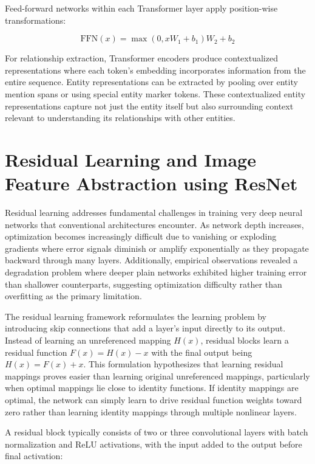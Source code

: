 \documentclass[12pt,a4paper]{report}
\begin{document}
Feed-forward networks within each Transformer layer apply position-wise transformations:

\begin{equation}
\text{FFN}(x) = \max(0, xW_1 + b_1)W_2 + b_2
\end{equation}

For relationship extraction, Transformer encoders produce contextualized representations where each token's embedding incorporates information from the entire sequence. Entity representations can be extracted by pooling over entity mention spans or using special entity marker tokens. These contextualized entity representations capture not just the entity itself but also surrounding context relevant to understanding its relationships with other entities.

\section{Residual Learning and Image Feature Abstraction using ResNet}

Residual learning addresses fundamental challenges in training very deep neural networks that conventional architectures encounter. As network depth increases, optimization becomes increasingly difficult due to vanishing or exploding gradients where error signals diminish or amplify exponentially as they propagate backward through many layers. Additionally, empirical observations revealed a degradation problem where deeper plain networks exhibited higher training error than shallower counterparts, suggesting optimization difficulty rather than overfitting as the primary limitation.

The residual learning framework reformulates the learning problem by introducing skip connections that add a layer's input directly to its output. Instead of learning an unreferenced mapping $H(x)$, residual blocks learn a residual function $F(x) = H(x) - x$ with the final output being $H(x) = F(x) + x$. This formulation hypothesizes that learning residual mappings proves easier than learning original unreferenced mappings, particularly when optimal mappings lie close to identity functions. If identity mappings are optimal, the network can simply learn to drive residual function weights toward zero rather than learning identity mappings through multiple nonlinear layers.

A residual block typically consists of two or three convolutional layers with batch normalization and ReLU activations, with the input added to the output before final activation:
\end{document}
